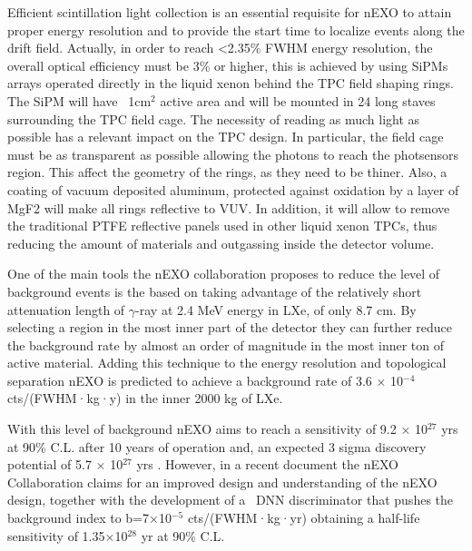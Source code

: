 Efficient scintillation light collection is an essential requisite for nEXO to attain proper energy resolution and to provide the start time to localize events along the drift field. Actually, in order to reach <2.35\% FWHM energy resolution, the overall optical efficiency must be 3\%  or higher, this is achieved by using SiPMs arrays operated directly in the liquid xenon behind the TPC field shaping rings. The SiPM will have ~1cm$^2$ active area and will be mounted in 24 long staves surrounding the TPC field cage. The necessity of reading as much light as possible has a relevant impact on the TPC design. In particular, the field cage must be as transparent as possible allowing the photons to reach the photsensors region. This affect the geometry of the rings, as they need to be thiner. Also, a coating of vacuum deposited aluminum, protected against oxidation by a layer of MgF2 will make all rings reflective to VUV. In addition, it will allow to remove the traditional PTFE reflective panels used in other liquid xenon TPCs, thus reducing the amount of materials and outgassing inside the detector volume.

One of the main tools the nEXO collaboration proposes to reduce the level of background events is the based on taking advantage of the relatively short attenuation length of $\gamma$-ray at 2.4 MeV energy in LXe, of only 8.7 cm. By selecting a region in the most inner part of the detector they can further reduce the background rate by almost an order of magnitude in the most inner ton of active material. Adding this technique to the energy resolution and topological separation nEXO is predicted to achieve a background rate of 3.6 × 10$^{-4}$ cts/(FWHM·kg·y) in the inner 2000 kg of LXe. 

With this level of background nEXO aims to reach a sensitivity of 9.2 × 10$^{27}$ yrs at 90\% C.L. after 10 years of operation and, an expected 3 sigma discovery potential of 5.7 × 
10$^{27}$ yrs \cite{nexocprecdr}. However, in a recent document \cite{nEXO:2021ujk} the nEXO Collaboration claims for an improved design and understanding of the nEXO design, together with the development of a \bbonu\ DNN discriminator that pushes the background index to 
b=7×10$^{-5}$ cts/(FWHM·kg·yr) obtaining a half-life sensitivity of 1.35×10$^{28}$ 
yr at 90\% C.L.